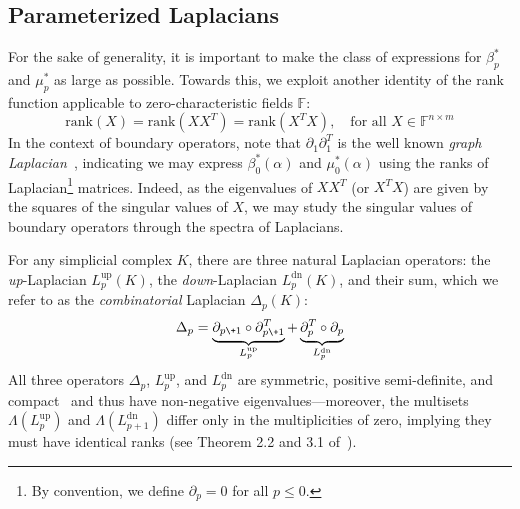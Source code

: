 \subsection{Parameterized Laplacians}\label{sec:laplacian_theory2}
 For the sake of generality, it is important to make the class of expressions for $\beta_p^\ast$ and $\mu_p^\ast$ as large as possible.
Towards this, we exploit another identity of the rank function applicable to zero-characteristic fields $\mathbb{F}$:
$$\mathrm{rank}(X) = \mathrm{rank}(X X^T) = \mathrm{rank}(X^T X), \quad \text{for all } X \in \mathbb{F}^{n \times m}$$ 
In the context of boundary operators, note that $\partial_1 \partial_1^T$ is the well known \emph{graph Laplacian}~\cite{chung1997spectral}, indicating we may express $\beta_0^\ast(\alpha)$ and $\mu_0^\ast(\alpha)$ using the ranks of Laplacian\footnote{By convention, we define $\partial_p = 0$ for all $p \leq 0$.} matrices.
Indeed, as the eigenvalues of $XX^T$ (or $X^T X$) are given by the squares of the singular values of $X$, we may study the singular values of boundary operators through the spectra of Laplacians.  

For any simplicial complex $K$, there are three natural Laplacian operators: the \emph{up}-Laplacian $L_p^{\text{up}}(K)$, the \emph{down}-Laplacian $L_p^{\text{dn}}(K)$, and their sum, which we refer to as the \emph{combinatorial} Laplacian $\Delta_p(K)$: 
\begin{equation}\label{eq:comb_lap}
	\Delta_p = \underbrace{\partial_{p\+1} \circ \partial_{p\+1}^T}_{L_p^{\text{up}}} + \underbrace{\partial_{p}^T  \circ  \partial_{p}}_{L_p^{\text{dn}}} 
\end{equation}
\noindent 
All three operators $\Delta_p$, $L_p^{\text{up}}$, and $L_p^{\text{dn}}$ are symmetric, positive semi-definite, and compact~\cite{memoli2022persistent} and thus have non-negative eigenvalues---moreover, the multisets $\Lambda(L_p^{\text{up}})$ and $\Lambda(L_{p+1}^{\text{dn}})$ differ only in the multiplicities of zero, implying they must have identical ranks (see Theorem 2.2 and 3.1 of~\cite{horak2013spectra}). 

